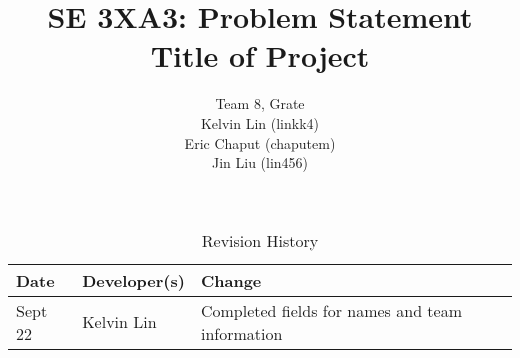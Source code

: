 \documentclass{article}
\title{SE 3XA3: Problem Statement\\Title of Project}
\author{Team 8, Grate
		\\ Kelvin Lin (linkk4)
		\\ Eric Chaput (chaputem)
		\\ Jin Liu (lin456)
}
\date{}
\begin{document}
\begin{table}[hp]
\caption{Revision History} \label{TblRevisionHistory}
\begin{tabularx}{\textwidth}{llX}
\toprule
\textbf{Date} & \textbf{Developer(s)} & \textbf{Change}\\
\midrule
Sept 22 & Kelvin Lin & Completed fields for names and team information\\
\bottomrule
\end{tabularx}
\end{table}

\newpage

\maketitle
\end{document}
